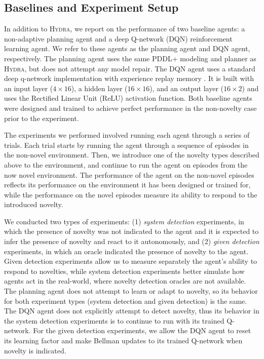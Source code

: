 \documentclass[letterpaper]{article} %
\newcommand{\hydra}{\textsc{Hydra}\xspace} %
\begin{document}


\subsection{Baselines and Experiment Setup}

In addition to \hydra, we report on the performance of two baseline agents: a non-adaptive planning agent and a deep Q-network (DQN) reinforcement learning agent. 
We refer to these agents as the planning agent and DQN agent, respectively. 
The planning agent uses the same PDDL+ modeling and planner as \hydra, but does not attempt any model repair.  
The DQN agent uses a standard deep q-network implementation with experience replay memory \cite{mnih2013playing}. It is built with an input layer ($4 \times 16$), a hidden layer ($16 \times 16$), and an output layer ($16 \times 2$) and uses the Rectified Linear Unit (ReLU) activation function.   
Both baseline agents were designed and trained to achieve perfect performance in the non-novelty case prior to the experiment. 



The experiments we performed involved running each agent through a series of trials. 
Each trial starts by running the agent through a sequence of episodes in the non-novel environment. 
Then, we introduce one of the novelty types described above to the environment, and continue to run the agent on episodes from the now novel environment. 
The performance of the agent on the non-novel episodes reflects its performance on the environment it has been designed or trained for, while the performance on the novel episodes measure its ability to respond to the introduced novelty. 


We conducted two types of experiments: (1) \emph{system detection} experiments, in which the presence of novelty was not indicated to the agent and it is expected to infer the presence of novelty and react to it autonomously, and (2) \emph{given detection} experiments, in which an oracle indicated the presence of novelty to the agent. 
Given detection experiments allow us to measure separately the agent's ability to respond to novelties, while system detection experiments better simulate how agents act in the real-world, where novelty detection oracles are not available. 
The planning agent does not attempt to learn or adapt to novelty, so its behavior for both experiment types (system detection and given detection) is the same. 
The DQN agent does not explicitly attempt to detect novelty, thus its behavior in the system detection experiments is to continue to run with its trained Q-network. 
For the given detection experiments, we allow the DQN agent to reset its learning factor and make Bellman updates to its trained Q-network when novelty is indicated.  
\end{document}
